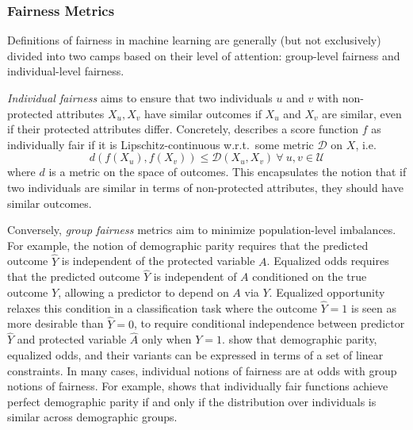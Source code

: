     \subsubsection{Fairness Metrics}  \label{sec:intro_fairmetrics}
    
        Definitions of fairness in machine learning are generally (but not exclusively) divided into two camps based on their level of attention: group-level fairness and individual-level fairness.
        
        \emph{Individual fairness} aims to ensure that two individuals $u$ and $v$ with non-protected attributes $X_u, X_v$ have similar outcomes if $X_u$ and $X_v$ are similar, even if their protected attributes differ. Concretely, \citep{dwork2012fairness} describes a score function $f$ as individually fair if it is Lipschitz-continuous w.r.t.\ some metric $\mathcal{D}$ on $X$, i.e.\
        \begin{equation}d(f(X_u), f(X_v)) \le \mathcal{D}(X_u, X_v) ~\forall~ u, v \in \mathcal{U}\label{eqn:IndFair}\end{equation}
        where $d$ is a metric on the space of outcomes. This encapsulates the notion that if two individuals are similar in terms of non-protected attributes, they should have similar outcomes.
        
        Conversely, \emph{group fairness} metrics aim to minimize population-level imbalances. For example, the notion of demographic parity \citep{dwork2012fairness} requires that the predicted outcome $\hat{Y}$ is independent of the protected variable $A$. Equalized odds \citep{HarPriSre2016} requires that the predicted outcome $\hat{Y}$ is independent of $A$ conditioned on the true outcome $Y$, allowing a predictor to depend on $A$ via $Y$. Equalized opportunity \citep{HarPriSre2016} relaxes this condition in a classification task where the outcome $\hat{Y}=1$ is seen as more desirable than $\hat{Y}=0$, to require conditional independence between predictor $\hat{Y}$ and protected variable $\hat{A}$ only when $Y=1$. \cite{AgaBeyDudLanWal2018} show that demographic parity, equalized odds, and their variants can be expressed in terms of a set of linear constraints.  In many cases, individual notions of fairness are at odds with group notions of fairness. For example, \cite{dwork2012fairness} shows that individually fair functions achieve perfect demographic parity if and only if the distribution over individuals is similar across demographic groups.

        

